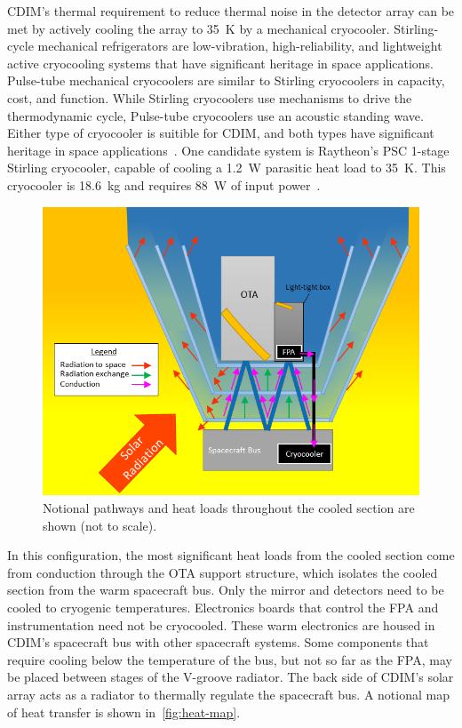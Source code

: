 \documentclass{ws-jai}
\begin{document}
CDIM's thermal requirement to reduce thermal noise in the detector array can be met by actively cooling the array to \SI{35}{\kelvin} by a mechanical cryocooler.
Stirling-cycle mechanical refrigerators are low-vibration, high-reliability, and lightweight active cryocooling systems that have significant heritage in space applications.
Pulse-tube mechanical cryocoolers are similar to Stirling cryocoolers in capacity, cost, and function.
While Stirling cryocoolers use mechanisms to drive the thermodynamic cycle, Pulse-tube cryocoolers use an acoustic standing wave.
Either type of cryocooler is suitible for CDIM, and both types have significant heritage in space applications~\cite{gilmore2003spacecraft}.
One candidate system is Raytheon's PSC 1-stage Stirling cryocooler, capable of cooling a \SI{1.2}{\watt} parasitic heat load to \SI{35}{\kelvin}.
This cryocooler is \SI{18.6}{\kilo\gram} and requires \SI{88}{\watt} of input power~\cite{ross2005cryocoolers}.

\begin{figure}[!ht]
  \centering
  \includegraphics[width=.7\linewidth]{figs/heat-map.png}
  \caption{Notional pathways and heat loads throughout the cooled section are shown (not to scale).
\label{fig:heat-map}
}
\end{figure}

In this configuration, the most significant heat loads from the cooled section come from conduction through the OTA support structure, which isolates the cooled section from the warm spacecraft bus.
Only the mirror and detectors need to be cooled to cryogenic temperatures.
Electronics boards that control the FPA and instrumentation need not be cryocooled.
These warm electronics are housed in CDIM's spacecraft bus with other spacecraft systems.
Some components that require cooling below the temperature of the bus, but not so far as the FPA, may be placed between stages of the V-groove radiator.
The back side of CDIM's solar array acts as a radiator to thermally regulate the spacecraft bus.
A notional map of heat transfer is shown in~\autoref{fig:heat-map}.
\end{document}
